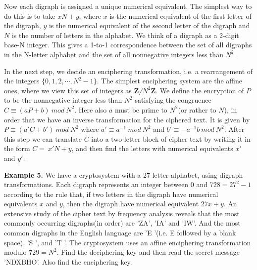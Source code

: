 \documentclass[12pt]{article}
\begin{document}
Now each digraph is assigned a unique numerical equivalent. The simplest way to do this is to take $xN+y$, where $x$ is the numerical equivalent of the first letter of the digraph, $y$ is the numerical equivalent of the second letter of the digraph and $N$ is the number of letters in the alphabet. We think of a digraph as a 2-digit base-N integer. This gives a 1-to-1 correspondence between the set of all digraphs in the N-letter alphabet and the set of all nonnegative integers less than $N^2$.

In the next step, we decide an enciphering transformation, i.e. a rearrangement of the integers $\{0,1,2,\cdots,N^2-1\}$. The simplest enciphering system  are the affine ones, where we view this set of integers as \textbf{Z}\textit{/$N^2$}\textbf{Z}. We define the encryption of $P$ to be the nonnegative integer less than $N^2$ satisfying the congruence $C \equiv (aP + b) \: mod \: N^2$. Here also $a$ must be prime to $N^2$(or rather to $N$), in order that we have an inverse transformation for the ciphered text. It is given by $P \equiv (a'C + b') \: mod \: N^2$ where $a' \equiv a^{-1} \: mod \: N^2$ and $b' \equiv -a^{-1}b \: mod \: N^2$. After this step we can translate $C$ into a two-letter block of cipher text by writing it in the form $C = \: x'N+y$, and then find the letters with numerical equivalents $x'$ and $y'$.

\textbf{Example 5.} We have a cryptosystem with a 27-letter alphabet, using digraph transformations. Each digraph represents an integer between $0$ and $728=27^2-1$ according to the rule that, if two letters in the digraph have numerical equivalents $x$ and $y$, then the digraph have numerical equivalent $27x+y$. An extensive study of the cipher text by frequency analysis reveals that the most commonly occurring digraphs(in order) are 'ZA', 'IA' and 'IW'. And the most common digraphs in the English language are 'E '(i.e. E followed by a blank space), 'S ', and 'T '. The cryptosystem uses an affine enciphering transformation modulo $729=N^2$. Find the deciphering key and then read the secret message 'NDXBHO'. Also find the enciphering key.
\end{document}
